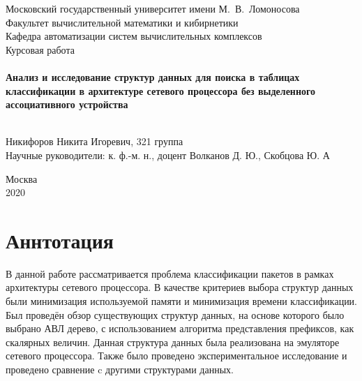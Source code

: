 \documentclass[a4peper, 12pt, titlepage, finall]{report}
\begin{document}
    \begin{titlepage}
        \begin{center}
            {\small \sc Московский государственный университет имени М.~В.~Ломоносова\\
            Факультет вычислительной математики и кибирнетики\\
            Кафедра автоматизации систем вычислительных комплексов\\}
            \vfill
            {\large \sc Курсовая работа}\\~\\

            {\large \bf Анализ и исследование структур данных для поиска в таблицах классификации в архитектуре сетевого процессора без выделенного ассоциативного устройства}\\~\\

        \end{center}
        
        \begin{flushright}
            \vfill
            \vfill
            {Никифоров Никита Игоревич, 321 группа}\\
            {Научные руководители: к. ф.-м. н., доцент Волканов Д. Ю., Скобцова Ю. А}
        \end{flushright}

        \begin{center}
            \vfill
            {\small Москва\\2020}
        \end{center}
    \end{titlepage}

    \chapter*{Аннтотация}
        В данной работе рассматривается проблема классификации пакетов в рамках архитектуры сетевого процессора. В качестве критериев выбора структур данных были минимизация 
        используемой памяти и минимизация времени классификации. Был проведён обзор существующих структур данных, на основе которого было выбрано АВЛ дерево,
        с использованием алгоритма представления префиксов, как скалярных величин. Данная структура данных была реализована на эмуляторе сетевого процессора.
        Также было проведено экспериментальное исследование и проведено сравнение c другими структурами данных.
        
\end{document}
